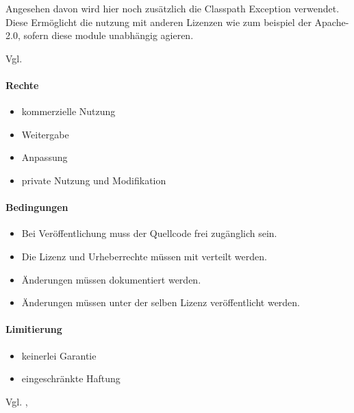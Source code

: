 Angesehen davon wird hier noch zusätzlich die Classpath Exception verwendet.
Diese Ermöglicht die nutzung mit anderen Lizenzen wie zum beispiel der Apache-2.0,
sofern diese module unabhängig agieren.

Vgl. \cite{gnu-classPath}

\paragraph{Rechte}
\begin{itemize}
    \item kommerzielle Nutzung
    \item Weitergabe
    \item Anpassung
    \item private Nutzung und Modifikation
\end{itemize}
\paragraph{Bedingungen}
\begin{itemize}
    \item Bei Veröffentlichung muss der Quellcode frei zugänglich sein.
    \item Die Lizenz und Urheberrechte müssen mit verteilt werden.
    \item Änderungen müssen dokumentiert werden.
    \item Änderungen müssen unter der selben Lizenz veröffentlicht werden.
\end{itemize}

\paragraph{Limitierung}
\begin{itemize}
    \item keinerlei Garantie
    \item eingeschränkte Haftung
\end{itemize}
Vgl. \cite{choosealicense-com}, \cite{gnu-why-upgrade-gplv3}


